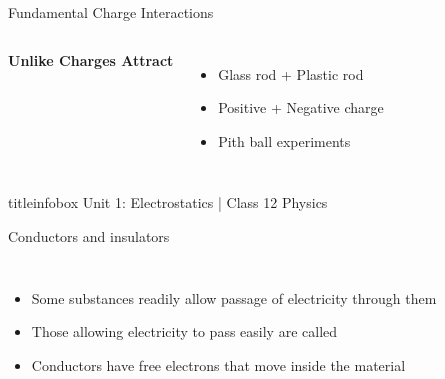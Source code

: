 \begin{frame}
\begin{frame}{Fundamental Charge Interactions}
\begin{columns}
        \centering
        \familiar{\Huge\faPlus\faMinus}
        
        \vspace{0.5cm}
        
        \textbf{Unlike Charges Attract}
        
        \vspace{0.5cm}
        
        \begin{itemize}
        \item Glass rod + Plastic rod
            \item Positive + Negative charge
            \item Pith ball experiments
        \end{itemize}
    \end{columns}
    
    \vspace{0.5cm}
    
    \begin{center}
    \end{center}
    
    \vfill
    
    \begin{beamercolorbox}[wd=\textwidth,ht=0.5cm,dp=0.1cm,center]{titleinfobox}
        \small\color{coolgray} Unit 1: Electrostatics | Class 12 Physics
    \end{beamercolorbox}
\end{frame}

\begin{frame}{Conductors and insulators}
    \begin{columns}
        \begin{itemize}
        \item Some substances readily allow passage of electricity through them
            
            \item Those allowing electricity to pass easily are called 
            
            \item Conductors have free electrons that move inside the material
            

\end{itemize}
\end{columns}
\end{frame}
\end{frame}
